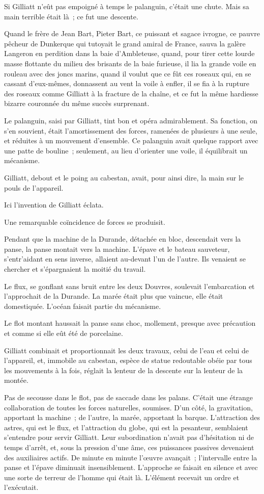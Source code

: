 \documentclass[french,twoside]{book} %
\begin{document}
Si Gilliatt n’eût pas empoigné à temps le palanguin, c’était une chute. Mais sa main terrible était là ; ce fut une descente.\par
Quand le frère de Jean Bart, Pieter Bart, ce puissant et sagace ivrogne, ce pauvre pêcheur de Dunkerque qui tutoyait le grand amiral de France, sauva la galère  Langeron en perdition dans la baie d’Ambleteuse, quand, pour tirer cette lourde masse flottante du milieu des brisants de la baie furieuse, il lia la grande voile en rouleau avec des joncs marins, quand il voulut que ce fût ces roseaux qui, en se cassant d’eux-mêmes, donnassent au vent la voile à enfler, il se fia à la rupture des roseaux comme Gilliatt à la fracture de la chaîne, et ce fut la même hardiesse bizarre couronnée du même succès surprenant.\par
Le palanguin, saisi par Gilliatt, tint bon et opéra admirablement. Sa fonction, on s’en souvient, était l’amortissement des forces, ramenées de plusieurs à une seule, et réduites à un mouvement d’ensemble. Ce palanguin avait quelque rapport avec une patte de bouline ; seulement, au lieu d’orienter une voile, il équilibrait un mécanisme.\par
Gilliatt, debout et le poing au cabestan, avait, pour ainsi dire, la main sur le pouls de l’appareil.\par
Ici l’invention de Gilliatt éclata.\par
Une remarquable coïncidence de forces se produisit.\par
Pendant que la machine de la Durande, détachée en bloc, descendait vers la panse, la panse montait vers la machine. L’épave et le bateau sauveteur, s’entr’aidant en sens inverse, allaient au-devant l’un de l’autre. Ils venaient se chercher et s’épargnaient la moitié du travail.\par
Le flux, se gonflant sans bruit entre les deux Douvres, soulevait l’embarcation et l’approchait de la Durande. La marée était plus que vaincue, elle était  domestiquée. L’océan faisait partie du mécanisme.\par
Le flot montant haussait la panse sans choc, mollement, presque avec précaution et comme si elle eût été de porcelaine.\par
Gilliatt combinait et proportionnait les deux travaux, celui de l’eau et celui de l’appareil, et, immobile au cabestan, espèce de statue redoutable obéie par tous les mouvements à la fois, réglait la lenteur de la descente sur la lenteur de la montée.\par
Pas de secousse dans le flot, pas de saccade dans les palans. C’était une étrange collaboration de toutes les forces naturelles, soumises. D’un côté, la gravitation, apportant la machine ; de l’autre, la marée, apportant la barque. L’attraction des astres, qui est le flux, et l’attraction du globe, qui est la pesanteur, semblaient s’entendre pour servir Gilliatt. Leur subordination n’avait pas d’hésitation ni de temps d’arrêt, et, sous la pression d’une âme, ces puissances passives devenaient des auxiliaires actifs. De minute en minute l’œuvre avançait ; l’intervalle entre la panse et l’épave diminuait insensiblement. L’approche se faisait en silence et avec une sorte de terreur de l’homme qui était là. L’élément recevait un ordre et l’exécutait.\par
\end{document}
